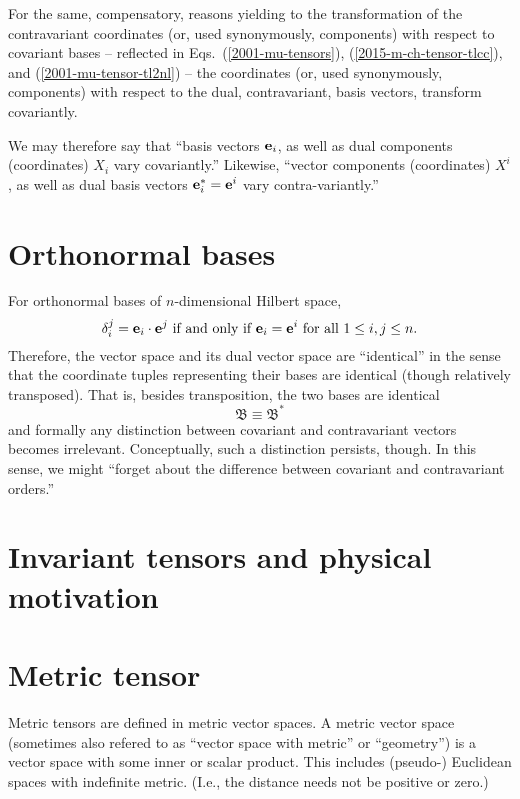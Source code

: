 For the same, compensatory, reasons yielding to the transformation of the contravariant coordinates (or, used synonymously, components)
with respect to covariant bases
--
reflected in Eqs.~(\ref{2001-mu-tensors}), (\ref{2015-m-ch-tensor-tlcc}), and (\ref{2001-mu-tensor-tl2nl})
--
the coordinates (or, used synonymously, components) with respect to the dual, contravariant, basis vectors, transform covariantly.

We may therefore say that
``basis vectors ${\bf e}_i$, as well as dual components (coordinates) $X_i$ vary covariantly.''
Likewise,
``vector components (coordinates) $X^i$, as well as dual basis vectors ${\bf e}^\ast_i= {\bf e}^i$ vary contra-variantly.''

\section{Orthonormal bases}
For orthonormal bases of $n$-dimensional Hilbert space,
\begin{equation}
\delta_i^j = {\bf e}_i\cdot {\bf e}^j
\textrm { if and only if }
{\bf e}_i= {\bf e}^i  \textrm { for all } 1\le i,j \le n.
\end{equation}
Therefore, the vector space and its dual vector space are ``identical''
in the sense that the coordinate tuples representing their bases are identical
(though relatively transposed).
That is, besides transposition, the two bases are identical
\begin{equation}
{\mathfrak B}\equiv {\mathfrak B}^\ast
\end{equation}
and  formally any distinction between covariant and contravariant vectors becomes
irrelevant. Conceptually, such a distinction persists, though.
In this sense, we might ``forget about the difference between
covariant and contravariant orders.''



\section{Invariant tensors and physical motivation}

\section{Metric tensor}

Metric tensors are defined in metric vector spaces.
A metric vector space (sometimes also refered to
as ``vector space with metric'' or ``geometry'')
is a vector space with some inner or scalar product.
This includes (pseudo-) Euclidean spaces with indefinite metric.
(I.e., the distance needs not be positive or zero.)




